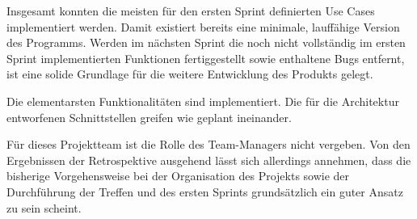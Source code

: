 Insgesamt konnten die meisten für den ersten Sprint definierten Use Cases implementiert werden. Damit existiert bereits eine minimale, lauffähige Version des Programms. Werden im nächsten Sprint die noch nicht vollständig im ersten Sprint implementierten Funktionen fertiggestellt sowie enthaltene Bugs entfernt, ist eine solide Grundlage für die weitere Entwicklung des Produkts gelegt.
\nsecend

Die elementarsten Funktionalitäten sind implementiert. Die für die Architektur entworfenen Schnittstellen greifen wie geplant ineinander. 
\nsecend

Für dieses Projektteam ist die Rolle des Team-Managers nicht vergeben. Von den Ergebnissen der Retrospektive ausgehend lässt sich allerdings annehmen, dass die bisherige Vorgehensweise bei der Organisation des Projekts sowie der Durchführung der Treffen und des ersten Sprints grundsätzlich ein guter Ansatz zu sein scheint. 
\nsecend

